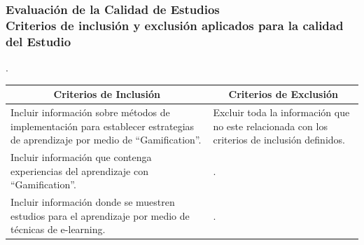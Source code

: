 \documentclass{beamer}
\begin{document}
\begin{frame}
    \frametitle{Evaluación de la Calidad de Estudios\\ Criterios de inclusión y exclusión aplicados para la calidad del Estudio}
    .\begin{table}
    	\begin{center}
    		\begin{tabular}{| p{6cm} | p{4cm} |}
    			\hline
    			\multicolumn{1}{|c|}{\textbf{Criterios de Inclusión}} & \multicolumn{1}{|c|}{\textbf{Criterios de Exclusión}} \\
    			\hline
    			Incluir información sobre métodos de implementación para establecer estrategias de aprendizaje por medio de ``Gamification''.{ }& Excluir toda la información que no este relacionada con los criterios de inclusión definidos.\\
    			\hline
    			Incluir información que contenga experiencias del aprendizaje con ``Gamification''. &{.} \\
    			\hline
    			Incluir información donde se muestren estudios para el aprendizaje por medio de técnicas de e-learning.& {.}\\ \hline
    		\end{tabular}
    	\end{center}
    \end{table}
\end{frame}
\end{document}

